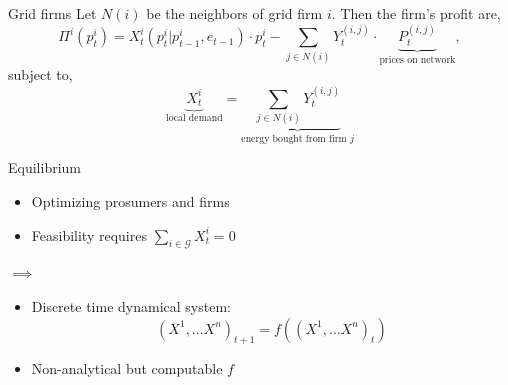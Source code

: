 \documentclass[xcolor={svgnames}]{beamer}
\begin{document}
\begin{frame}{Grid firms}
    Let $N(i)$ be the neighbors of grid firm $i$. Then the firm's profit are,
    \begin{equation}
        \Pi^i(p^i_t) = X^i_{t}(p^i_t\vert p^i_{t-1}, e_{t-1}) \cdot p^i_t - \sum_{j \in N(i)} Y^{(i, j)}_{t} \cdot \underbrace{P^{(i, j)}_t}_{\text{prices on network}},
    \end{equation}
    subject to,
    \begin{equation}
        \underbrace{X^i_t}_{\text{local demand}} =  \underbrace{\sum_{j \in N(i)} Y^{(i, j)}_{t}}_{\text{energy bought from firm $j$}}
    \end{equation}
\end{frame}

\begin{frame}{Equilibrium}
    \begin{minipage}{.35\linewidth}
        \begin{itemize}
            \item Optimizing prosumers and firms
            \item Feasibility requires $\sum_{i \in \mathcal{G}} X^i_t = 0$
        \end{itemize}
    \end{minipage}
    $\implies$
    \begin{minipage}{.55\linewidth}
        \begin{itemize}
            \item Discrete time dynamical system: \begin{equation*}(X^1, \ldots X^n)_{t+1} = f((X^1, \ldots X^n)_t)\end{equation*}
            \item Non-analytical but computable $f$
        \end{itemize}
    \end{minipage}
    \vfill
    \centering

\end{frame}
\end{document}
